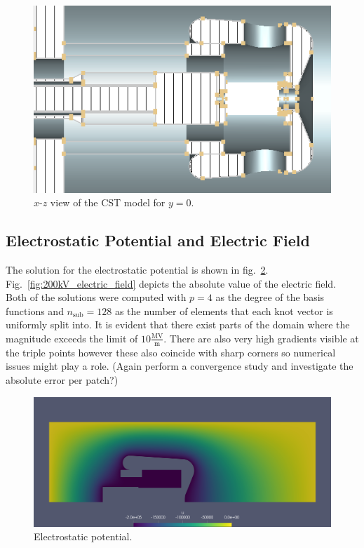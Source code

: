 \begin{center}
\begin{figure}[H]
  \includegraphics[width=\textwidth]{figures/200kV/v1_cuty}
  \caption{$x$-$z$ view of the CST model for $y=0$.}
  \label{fig:cst_geometry_xz}
\end{figure}
\end{center}

\subsection{Electrostatic Potential and Electric Field}
The solution for the electrostatic potential is shown in fig.~\ref{fig:200kV_potential}. Fig.~\ref{fig:200kV_electric_field} depicts the absolute value of the electric field.
Both of the solutions were computed with $p=4$ as the degree of the basis functions and $n_\mathrm{sub}=128$ as the number of elements that each knot vector is uniformly split into.
It is evident that there exist parts of the domain where the magnitude exceeds the limit of $10 \frac{\mathrm{MV}}{\mathrm{m}}$. There are also very high gradients visible at the triple points however these also coincide with sharp corners so numerical issues might play a role. (Again perform a convergence study and investigate the absolute error per patch?)

\begin{center}
\begin{figure}[H]
  \includegraphics[width=\textwidth]{figures/200kV/potential}
  \caption{Electrostatic potential.}
  \label{fig:200kV_potential}
\end{figure}
\end{center}

